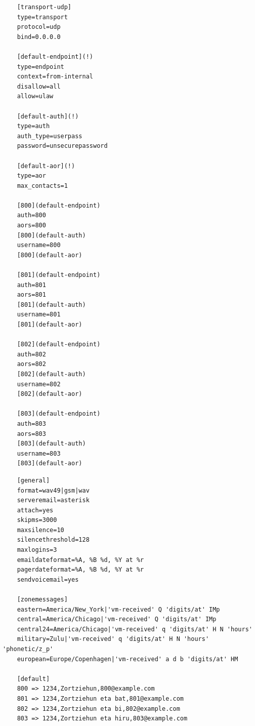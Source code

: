 \begin{listing}
    \begin{verbatim}
    [transport-udp]
    type=transport
    protocol=udp
    bind=0.0.0.0
    
    [default-endpoint](!)
    type=endpoint
    context=from-internal
    disallow=all
    allow=ulaw

    [default-auth](!)
    type=auth
    auth_type=userpass
    password=unsecurepassword

    [default-aor](!)
    type=aor
    max_contacts=1
    
    [800](default-endpoint)
    auth=800
    aors=800
    [800](default-auth)
    username=800
    [800](default-aor)
    
    [801](default-endpoint)
    auth=801
    aors=801
    [801](default-auth)
    username=801
    [801](default-aor)
    
    [802](default-endpoint)
    auth=802
    aors=802
    [802](default-auth)
    username=802
    [802](default-aor)
    
    [803](default-endpoint)
    auth=803
    aors=803
    [803](default-auth)
    username=803
    [803](default-aor)
    \end{verbatim}
    \caption{/etc/asterisk/pjsip.conf konfigurazio fitxategia}
    \label{lst:pjsip.conf}
\end{listing}

\begin{listing}
    \begin{verbatim}
    [general]
    format=wav49|gsm|wav
    serveremail=asterisk
    attach=yes
    skipms=3000
    maxsilence=10
    silencethreshold=128
    maxlogins=3
    emaildateformat=%A, %B %d, %Y at %r
    pagerdateformat=%A, %B %d, %Y at %r
    sendvoicemail=yes
    
    [zonemessages]
    eastern=America/New_York|'vm-received' Q 'digits/at' IMp
    central=America/Chicago|'vm-received' Q 'digits/at' IMp
    central24=America/Chicago|'vm-received' q 'digits/at' H N 'hours'
    military=Zulu|'vm-received' q 'digits/at' H N 'hours' 'phonetic/z_p'
    european=Europe/Copenhagen|'vm-received' a d b 'digits/at' HM

    [default]
    800 => 1234,Zortziehun,800@example.com
    801 => 1234,Zortziehun eta bat,801@example.com
    802 => 1234,Zortziehun eta bi,802@example.com
    803 => 1234,Zortziehun eta hiru,803@example.com
    \end{verbatim}
    \caption{/etc/asterisk/voicemail.conf konfigurazio fitxategia}
    \label{lst:voicemail.conf}
\end{listing}